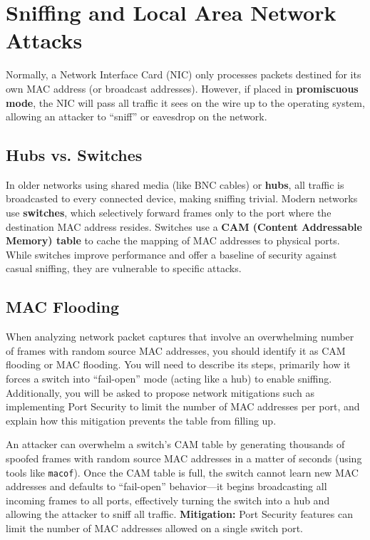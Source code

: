 \section{Sniffing and Local Area Network Attacks}

Normally, a Network Interface Card (NIC) only processes packets destined for its own MAC address (or broadcast addresses). However, if placed in \textbf{promiscuous mode}, the NIC will pass all traffic it sees on the wire up to the operating system, allowing an attacker to ``sniff'' or eavesdrop on the network.

\subsection{Hubs vs. Switches}
In older networks using shared media (like BNC cables) or \textbf{hubs}, all traffic is broadcasted to every connected device, making sniffing trivial. Modern networks use \textbf{switches}, which selectively forward frames only to the port where the destination MAC address resides. Switches use a \textbf{CAM (Content Addressable Memory) table} to cache the mapping of MAC addresses to physical ports. While switches improve performance and offer a baseline of security against casual sniffing, they are vulnerable to specific attacks.

\subsection{MAC Flooding}

\begin{tcolorbox}[colback=blue!5!white,colframe=blue!75!black,title=Exam Insight]
When analyzing network packet captures that involve an overwhelming number of frames with random source MAC addresses, you should identify it as CAM flooding or MAC flooding. You will need to describe its steps, primarily how it forces a switch into ``fail-open'' mode (acting like a hub) to enable sniffing. Additionally, you will be asked to propose network mitigations such as implementing Port Security to limit the number of MAC addresses per port, and explain how this mitigation prevents the table from filling up.
\end{tcolorbox}

An attacker can overwhelm a switch's CAM table by generating thousands of spoofed frames with random source MAC addresses in a matter of seconds (using tools like \texttt{macof}). Once the CAM table is full, the switch cannot learn new MAC addresses and defaults to ``fail-open'' behavior---it begins broadcasting all incoming frames to all ports, effectively turning the switch into a hub and allowing the attacker to sniff all traffic.
\textbf{Mitigation:} Port Security features can limit the number of MAC addresses allowed on a single switch port.

